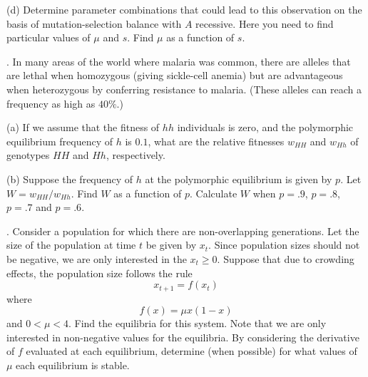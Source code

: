 \documentclass[reqno,12pt]{amsart}
\begin{document}
\noindent
(d)  Determine parameter combinations that could lead to this
observation on the basis of mutation-selection balance with
$A$ recessive.  Here you need to find particular values of
$\mu$ and $s$.  Find $\mu$ as a function of $s$.


\bigskip

. In many areas of the world where malaria was common, there
are alleles that are lethal when homozygous (giving sickle-cell
anemia) but are advantageous when heterozygous by conferring
resistance to malaria.  (These alleles can reach a frequency as
high as $40 \%$.)

\noindent
(a) If we assume that the fitness of $hh$ individuals is zero,
and the polymorphic equilibrium frequency of $h$ is $0.1$, what
are the relative fitnesses $w_{HH}$ and $w_{Hh}$ of genotypes
$HH$ and $Hh$, respectively.

\noindent
(b) Suppose the frequency of $h$ at the polymorphic equilibrium
is given by $p$.  Let $W = w_{HH}/w_{Hh}$.  Find $W$ as a function
of $p$.  Calculate $W$ when $p=.9$, $p=.8$, $p=.7$ and $p=.6$.
\bigskip

.  Consider a population for which there are non-overlapping
generations.  Let the size of the population at time $t$ be given
by $x_t$.  Since population sizes should not be negative, we are
only interested in the $x_t \ge 0$.  Suppose that due to crowding
effects, the population size follows the rule
$$
x_{t+1} = f(x_t) 
$$
where
$$
f(x) = \mu x (1-x)
$$
and $0 < \mu < 4$.  Find the equilibria for this system.  Note that we
are only interested in non-negative values for the equilibria.  By
considering the derivative of $f$ evaluated at each equilibrium,
determine (when possible) for what values of $\mu$ each equilibrium
is stable.
\end{document}

